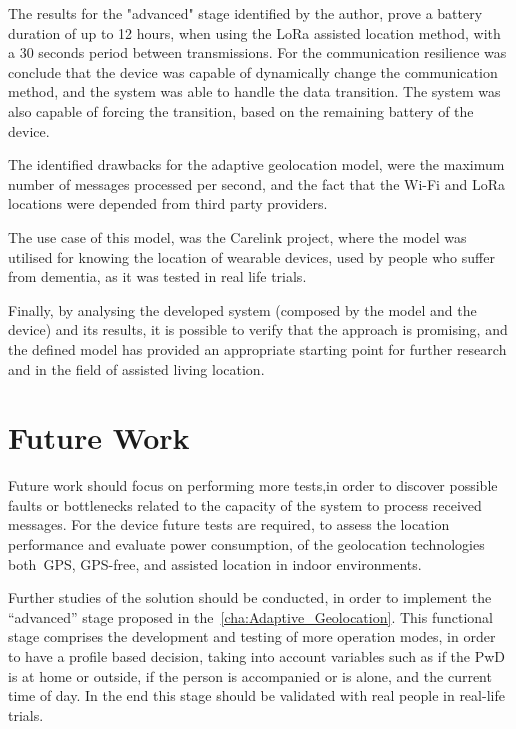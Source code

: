 The results for the "advanced" stage identified by the author, prove a battery duration of up to 12 hours, when using the LoRa assisted location method, with a 30 seconds period between transmissions. For the communication resilience was conclude that the device was capable of dynamically change the communication method, and the system was able to handle the data transition. The system was also capable of forcing the transition, based on the remaining battery of the device.

The identified drawbacks for the adaptive geolocation model, were the maximum number of messages processed per second, and the fact that the Wi-Fi and LoRa locations were depended from third party providers.

The use case of this model, was the Carelink project, where the model was utilised for knowing the location of wearable devices, used by people who suffer from dementia, as it was tested in real life trials. 

Finally, by analysing the developed system (composed by the model and the device) and its results, it is possible to verify that the approach is promising, and the defined model has provided an appropriate starting point for further research and in the field of assisted living location.


\section{Future Work}
\label{sec:Future_work}

Future work should focus on performing more tests,in order to discover possible faults or bottlenecks related to the capacity of the system to process received messages. For the device future tests are required, to assess the
location performance and evaluate power consumption, of the geolocation technologies both~\gls{GPS}, GPS-free, and assisted location in indoor environments.


Further studies of the solution should be conducted, in order to implement the “advanced” stage proposed in the~\ref{cha:Adaptive_Geolocation}. This functional stage comprises the development and testing of more operation modes, in order to have a profile based decision, taking into account variables such as if the PwD is at home or outside, if the person is accompanied or is alone, and the current time of day. In the end this stage should be validated with real people in real-life trials.




